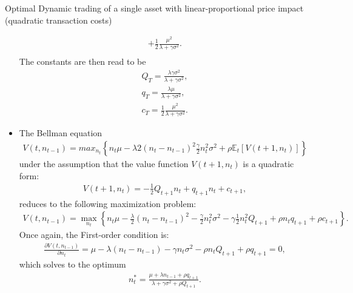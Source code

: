 \documentclass[10pt]{article}
\newcommand{\Ebb}{\mathbb{E}}
\newenvironment{exercise}[2][Exercise]{\begin{trivlist}
  \item[\hskip \labelsep {\bfseries #1}\hskip \labelsep {\bfseries #2.}]}{\end{trivlist}}
\begin{document}
\begin{exercise}{3}{Optimal Dynamic trading of a single asset with linear-proportional price impact (quadratic transaction costs)}
\begin{itemize}
\begin{align*}
        + \frac 1 2 \frac{\mu^2}{\lambda  + \gamma\sigma^2}.  \\
  \end{align*}
  The constants are then read to be
  \begin{align*}
    Q_T = \frac{\lambda\gamma\sigma^2}{\lambda + \gamma\sigma^2}, \\
    q_T = \frac{\lambda \mu}{\lambda + \gamma\sigma^2}, \\
    c_T = \frac 1 2 \frac{\mu^2}{\lambda + \gamma \sigma^2}.
  \end{align*}

  \item
    The Bellman equation
    \begin{align*}
      V(t, n_{t - 1}) = max_{n_t}\left\{ n_t\mu - \lambda 2 (n_t - n_{t-1})^2
      \frac \gamma 2 n_t^2 \sigma^2 + \rho \Ebb_t\left[ V(t+1, n_t) \right] \right\}
    \end{align*}
    under the assumption that the value function $V(t +1, n_t)$ is a quadratic
    form:
    \begin{align*}
      V(t+1, n_t) = - \frac 1 2 Q_{t+1}n_{t} + q_{t+1}n_t + c_{t + 1},
    \end{align*}
    reduces to the following maximization problem:
    \begin{align*}
      V(t, n_{t-1}) = \max_{n_t}\left\{ n_t \mu - \frac \lambda 2 (n_t -
      n_{t-1})^2 - \frac \gamma 2 n_t^2 \sigma^2 - \gamma \frac 1 2 n_t^2
      Q_{t+1} + \rho n_t q_{t+1} + \rho c_{t+1} \right\}.
    \end{align*}
    Once again, the First-order condition is:
    \begin{align*}
      \frac{\partial V(t,n_{t-1})}{\partial n_t} = \mu - \lambda(n_t - n_{t-1})
      - \gamma n_t \sigma^2 - \rho n_t Q_{t+1} + \rho q_{t+1} = 0,
    \end{align*}
    which solves to the optimum
    \begin{align*}
      n_t^* = \frac{\mu + \lambda n_{t-1} + \rho q_{t+1}}{\lambda + \gamma\sigma^2+ \rho Q_{t+1}}.
    \end{align*}


\end{itemize}
\end{exercise}
\end{document}
